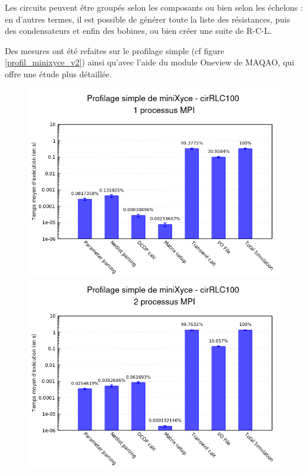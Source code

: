 \documentclass[11pt,a4paper,oneside]{memoir}
\theoremstyle{definition}
\theoremstyle{remark}
\theoremstyle{plain}
\begin{document}
Les circuits peuvent être groupés selon les composants ou bien selon les échelons : en d'autres termes, il est possible de générer toute la liste des résistances, puis des condensateurs et enfin des bobines, ou bien créer une suite de R-C-L.\bigskip

Des mesures ont été refaites sur le profilage simple (cf figure \ref{profil_minixyce_v2}) ainsi qu'avec l'aide du module Oneview de MAQAO, qui offre une étude plus détaillée.

\begin{figure}
\begin{center}
\includegraphics[scale=0.45]{Images-Rapport/Profil_miniXyce_v2/Profil_miniXyce_v2_1proc.png}
\includegraphics[scale=0.45]{Images-Rapport/Profil_miniXyce_v2/Profil_miniXyce_v2_2proc.png}

\end{center}
\end{figure}
\end{document}
